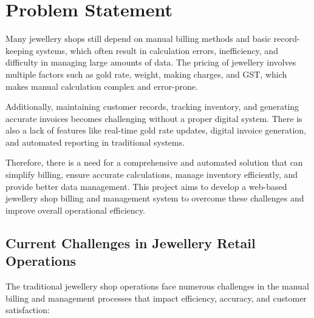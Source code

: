 \documentclass[12pt,a4paper]{report}
\begin{document}
\newpage

\chapter{Problem Statement}
\vspace{-1cm}
\hspace{1cm} Many jewellery shops still depend on manual billing methods and basic record-keeping systems, which often result in calculation errors, inefficiency, and difficulty in managing large amounts of data. The pricing of jewellery involves multiple factors such as gold rate, weight, making charges, and GST, which makes manual calculation complex and error-prone.

Additionally, maintaining customer records, tracking inventory, and generating accurate invoices becomes challenging without a proper digital system. There is also a lack of features like real-time gold rate updates, digital invoice generation, and automated reporting in traditional systems.

Therefore, there is a need for a comprehensive and automated solution that can simplify billing, ensure accurate calculations, manage inventory efficiently, and provide better data management. This project aims to develop a web-based jewellery shop billing and management system to overcome these challenges and improve overall operational efficiency.

\section{Current Challenges in Jewellery Retail Operations}

The traditional jewellery shop operations face numerous challenges in the manual billing and management processes that impact efficiency, accuracy, and customer satisfaction:
\end{document}
